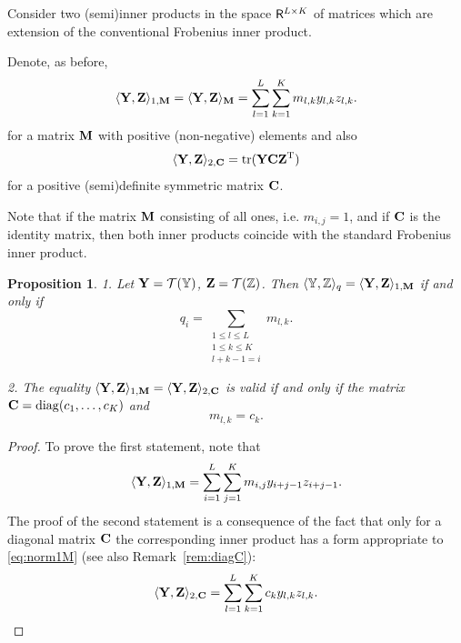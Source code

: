 \documentclass[sii]{ipart}
\DeclareMathOperator{\tr}{tr}
\newtheorem{proposition}{Proposition}
\begin{document}
Consider two (semi)inner products in the space $\mathsf{R}^{L \times K}$ of matrices which are extension of the conventional Frobenius inner product.

Denote, as before,
\begin{equation}
\label{eq:norm1M}
\langle\bfY,\bfZ\rangle_{1,\bfM} = \langle\bfY,\bfZ\rangle_{\bfM} = \sum_{l = 1}^L \sum_{k=1}^K m_{l,k} y_{l,k} z_{l,k}.
\end{equation}
for a matrix $\mathbf{M}$ with positive (non-negative) elements and also
\begin{equation}
\label{eq:norm2S}
\langle\bfY,\bfZ\rangle_{2,\bfC} = \tr(\bfY \bfC \bfZ^\rmT)
\end{equation}
for a positive (semi)definite symmetric matrix $\mathbf{C}$.

Note that if the matrix $\mathbf{M}$ consisting of all ones, i.e. $m_{i,j}=1$,
and if $\mathbf{C}$ is the identity matrix, then both inner products coincide with the standard Frobenius inner product.

\begin{proposition}
	\label{prop:equiv_tasks}
	1. Let $\mathbf{Y} = \mathcal{T}(\mathbb{Y})$,  $\mathbf{Z} = \mathcal{T}(\mathbb{Z})$. Then $\langle\mathbb{Y},\mathbb{Z}\rangle_q= \langle \mathbf{Y},\mathbf{Z} \rangle_{1,\mathbf{M}}$ if and only if
	\begin{equation}\label{qi_mi}
	q_i = \sum_{\substack{1 \le l \le L \\ 1 \le k \le K \\ l+k-1=i}} m_{l,k}.
	\end{equation}
	
	2. The equality $\langle\mathbf{Y},\mathbf{Z}\rangle_{1,\mathbf{M}}= \langle\mathbf{Y},\mathbf{Z}\rangle_{2,\mathbf{C}}$ is valid if and only if
the matrix $\mathbf{C}=\mathop{\mathrm{diag}}(c_1,\ldots,c_K)$ and 
	\begin{equation}\label{sk_mlk}
	m_{l,k}=c_k.
	\end{equation}
\end{proposition}
\begin{proof}
	To prove the first statement, note that
	\begin{equation*}
	\langle \bfY, \bfZ \rangle_{1,\bfM} = \sum_{i = 1}^L \sum_{j = 1}^K m_{i,j} y_{i + j - 1} z_{i + j - 1}.
	\end{equation*}
The proof of the second statement is a consequence of the fact that only for a diagonal matrix $\mathbf{C}$ the corresponding inner product has a form appropriate to \eqref{eq:norm1M} (see also Remark~\ref{rem:diagC}):
	\begin{equation*}
	\langle \bfY, \bfZ \rangle_{2,\bfC} = \sum_{l=1}^L \sum_{k=1}^K c_k y_{l,k} z_{l, k}.
	\end{equation*}
\end{proof}
\end{document}
